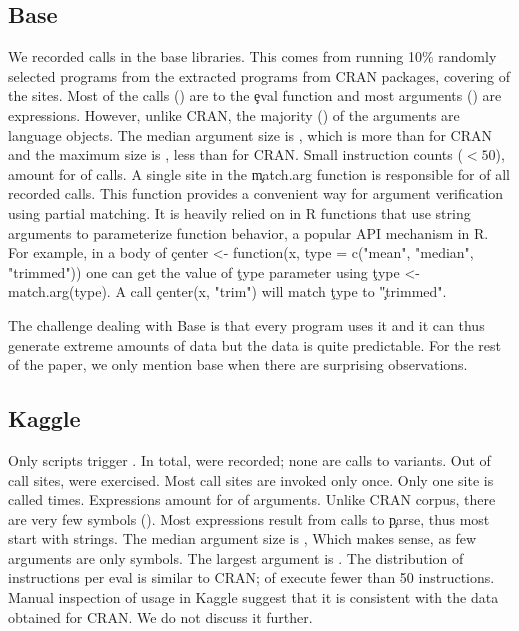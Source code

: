 \documentclass[screen,acmsmall]{acmart}
\begin{document}
\subsection{Base}

We recorded \baseAllcalls \eval calls in the \BasePackages base libraries. This
comes from running 10\% randomly selected programs from the
\CranRunnableScriptsRnd extracted programs from CRAN packages, covering
\baseTriggeredevalpct of the \BaseEvalCallSites sites. Most of the calls
(\baseEvalsratio) are to the \c{eval} function and most arguments
(\baseCodepercent) are expressions. However, unlike CRAN, the majority
(\baseLanguagepercent) of the arguments are language objects. The median
argument size is \baseMedianszeval, which is more than for CRAN and the maximum
size is \baseMaxszeval, less than for CRAN. Small instruction counts ($<50$),
amount for \baseSmalleventspct of calls. A single site in the \c{match.arg}
function is responsible for \baseTopFuncPercent of all recorded calls. This
function provides a convenient way for argument verification using partial
matching. It is heavily relied on in R functions that use string arguments to
parameterize function behavior, a popular API mechanism in R. For example, in a
body of \c{center <- function(x, type = c("mean", "median", "trimmed"))} one
can get the value of \c{type} parameter using \c{type <- match.arg(type)}. A
call \c{center(x, "trim")} will match \c{type} to \c{"trimmed"}.

The challenge dealing with Base is that every program uses it and it can thus
generate extreme amounts of data but the data is quite predictable. For the
rest of the paper, we only mention base when there are surprising
observations.



\medskip

\subsection{Kaggle}
Only \kaggleNbruns scripts trigger \eval. In total, \kaggleAllcalls \eval were
recorded; none are calls to variants. Out of \kaggleStaticeval call sites,
\kaggleTriggeredeval were exercised. Most call sites are invoked only once. Only
one site is called \kaggleMaxcalls times. Expressions amount for
\kaggleCodepercent of arguments. Unlike CRAN corpus, there are very few symbols
(\kaggleSymbolpercent). Most expressions result from calls to \c{parse}, thus
most \evals start with strings. The median argument size is \kaggleMedianszeval,
Which makes sense, as few arguments are only symbols. The largest argument is
\kaggleMaxszeval. The distribution of instructions per eval is similar to CRAN;
\kaggleSmalleventspct of \evals execute fewer than 50 instructions. Manual
inspection of \eval usage in Kaggle suggest that it is consistent with the data
obtained for CRAN. We do not discuss it further.
\end{document}
